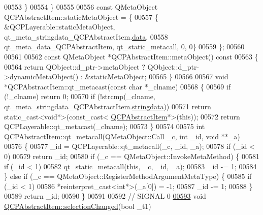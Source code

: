 \begin{DoxyCode}
00553     \}
00554 \}
00555 
00556 \textcolor{keyword}{const} QMetaObject QCPAbstractItem::staticMetaObject = \{
00557     \{ &QCPLayerable::staticMetaObject, qt\_meta\_stringdata\_QCPAbstractItem.\hyperlink{a00067_ab4317fd8db7c91bab9009e558b7cb145}{data},
00558       qt\_meta\_data\_QCPAbstractItem,  qt\_static\_metacall, 0, 0\}
00559 \};
00560 
00561 
00562 \textcolor{keyword}{const} QMetaObject *QCPAbstractItem::metaObject()\textcolor{keyword}{ const}
00563 \textcolor{keyword}{}\{
00564     \textcolor{keywordflow}{return} QObject::d\_ptr->metaObject ? QObject::d\_ptr->dynamicMetaObject() : &staticMetaObject;
00565 \}
00566 
00567 \textcolor{keywordtype}{void} *QCPAbstractItem::qt\_metacast(\textcolor{keyword}{const} \textcolor{keywordtype}{char} *\_clname)
00568 \{
00569     \textcolor{keywordflow}{if} (!\_clname) \textcolor{keywordflow}{return} 0;
00570     \textcolor{keywordflow}{if} (!strcmp(\_clname, qt\_meta\_stringdata\_QCPAbstractItem.\hyperlink{a00067_ade6e562aa7d6defc621f68d53679440b}{stringdata}))
00571         \textcolor{keywordflow}{return} \textcolor{keyword}{static\_cast<}\textcolor{keywordtype}{void}*\textcolor{keyword}{>}(\textcolor{keyword}{const\_cast<} \hyperlink{a00022}{QCPAbstractItem}*\textcolor{keyword}{>}(\textcolor{keyword}{this}));
00572     \textcolor{keywordflow}{return} QCPLayerable::qt\_metacast(\_clname);
00573 \}
00574 
00575 \textcolor{keywordtype}{int} QCPAbstractItem::qt\_metacall(QMetaObject::Call \_c, \textcolor{keywordtype}{int} \_id, \textcolor{keywordtype}{void} **\_a)
00576 \{
00577     \_id = QCPLayerable::qt\_metacall(\_c, \_id, \_a);
00578     \textcolor{keywordflow}{if} (\_id < 0)
00579         \textcolor{keywordflow}{return} \_id;
00580     \textcolor{keywordflow}{if} (\_c == QMetaObject::InvokeMetaMethod) \{
00581         \textcolor{keywordflow}{if} (\_id < 1)
00582             qt\_static\_metacall(\textcolor{keyword}{this}, \_c, \_id, \_a);
00583         \_id -= 1;
00584     \} \textcolor{keywordflow}{else} \textcolor{keywordflow}{if} (\_c == QMetaObject::RegisterMethodArgumentMetaType) \{
00585         \textcolor{keywordflow}{if} (\_id < 1)
00586             *\textcolor{keyword}{reinterpret\_cast<}\textcolor{keywordtype}{int}*\textcolor{keyword}{>}(\_a[0]) = -1;
00587         \_id -= 1;
00588     \}
00589     \textcolor{keywordflow}{return} \_id;
00590 \}
00591 
00592 \textcolor{comment}{// SIGNAL 0}
\hypertarget{a00067_source_l00593}{}\hyperlink{a00022_aa5cffb034fc65dbb91c77e02c1c14251}{00593} \textcolor{keywordtype}{void} \hyperlink{a00022_aa5cffb034fc65dbb91c77e02c1c14251}{QCPAbstractItem::selectionChanged}(\textcolor{keywordtype}{bool} \_t1)

\end{DoxyCode}
